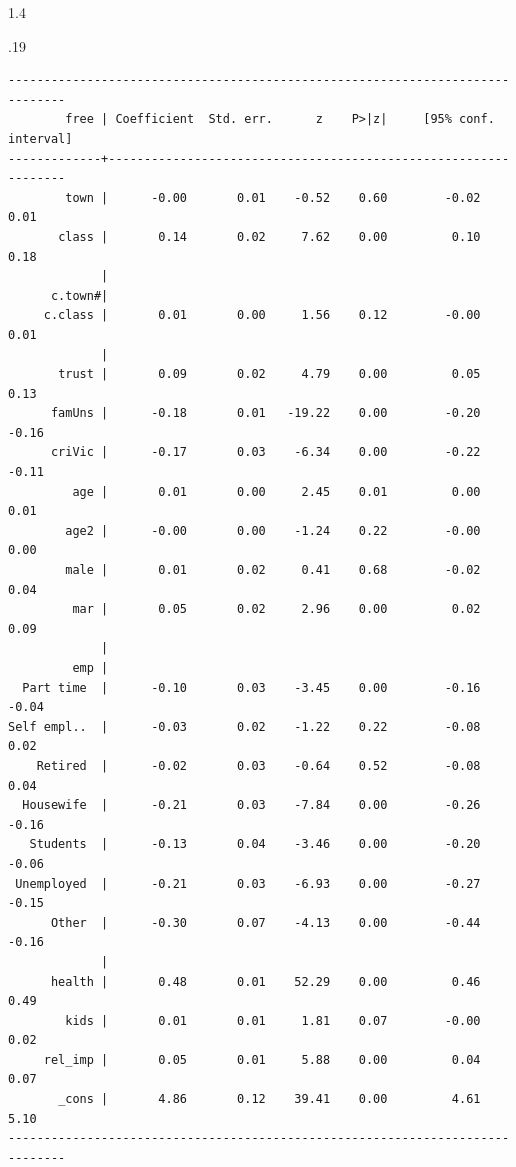 \documentclass[10pt, letterpaper]{article}
\begin{document}
\begin{spacing}{1.4}
\begin{scriptsize}
\begin{spacing}{.19}
\begin{verbatim}
------------------------------------------------------------------------------
        free | Coefficient  Std. err.      z    P>|z|     [95% conf. interval]
-------------+----------------------------------------------------------------
        town |      -0.00       0.01    -0.52    0.60        -0.02        0.01
       class |       0.14       0.02     7.62    0.00         0.10        0.18
             |
      c.town#|
     c.class |       0.01       0.00     1.56    0.12        -0.00        0.01
             |
       trust |       0.09       0.02     4.79    0.00         0.05        0.13
      famUns |      -0.18       0.01   -19.22    0.00        -0.20       -0.16
      criVic |      -0.17       0.03    -6.34    0.00        -0.22       -0.11
         age |       0.01       0.00     2.45    0.01         0.00        0.01
        age2 |      -0.00       0.00    -1.24    0.22        -0.00        0.00
        male |       0.01       0.02     0.41    0.68        -0.02        0.04
         mar |       0.05       0.02     2.96    0.00         0.02        0.09
             |
         emp |
  Part time  |      -0.10       0.03    -3.45    0.00        -0.16       -0.04
Self empl..  |      -0.03       0.02    -1.22    0.22        -0.08        0.02
    Retired  |      -0.02       0.03    -0.64    0.52        -0.08        0.04
  Housewife  |      -0.21       0.03    -7.84    0.00        -0.26       -0.16
   Students  |      -0.13       0.04    -3.46    0.00        -0.20       -0.06
 Unemployed  |      -0.21       0.03    -6.93    0.00        -0.27       -0.15
      Other  |      -0.30       0.07    -4.13    0.00        -0.44       -0.16
             |
      health |       0.48       0.01    52.29    0.00         0.46        0.49
        kids |       0.01       0.01     1.81    0.07        -0.00        0.02
     rel_imp |       0.05       0.01     5.88    0.00         0.04        0.07
       _cons |       4.86       0.12    39.41    0.00         4.61        5.10
------------------------------------------------------------------------------


\end{verbatim}
\end{spacing}
\end{scriptsize}
\end{spacing}
\end{document}
